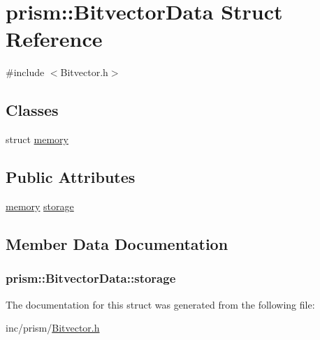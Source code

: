 \hypertarget{structprism_1_1_bitvector_data}{}\section{prism\+:\+:Bitvector\+Data Struct Reference}
\label{structprism_1_1_bitvector_data}


{\ttfamily \#include $<$Bitvector.\+h$>$}

\subsection*{Classes}
\begin{DoxyCompactItemize}
\item 
struct \hyperlink{structprism_1_1_bitvector_data_1_1memory}{memory}
\end{DoxyCompactItemize}
\subsection*{Public Attributes}
\begin{DoxyCompactItemize}
\item 
\hyperlink{structprism_1_1_bitvector_data_1_1memory}{memory} \hyperlink{structprism_1_1_bitvector_data_abcf70b2679d4c52bf398a1a308aca5c2}{storage}
\end{DoxyCompactItemize}


\subsection{Member Data Documentation}
\subsubsection[{\texorpdfstring{storage}{storage}}]{ prism\+::\+Bitvector\+Data\+::storage}\hypertarget{structprism_1_1_bitvector_data_abcf70b2679d4c52bf398a1a308aca5c2}{}\label{structprism_1_1_bitvector_data_abcf70b2679d4c52bf398a1a308aca5c2}


The documentation for this struct was generated from the following file\+:\begin{DoxyCompactItemize}
\item 
inc/prism/\hyperlink{_bitvector_8h}{Bitvector.\+h}\end{DoxyCompactItemize}
